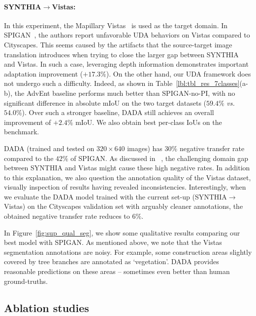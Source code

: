 \documentclass[10pt,twocolumn,letterpaper]{article}
\begin{document}
\paragraph{SYNTHIA$\rightarrow$Vistas:} In this experiment, the Mapillary Vistas~\cite{MVD2017} is used as the target domain. 
In SPIGAN~\cite{lee2018spigan}, the authors report unfavorable UDA behaviors on Vistas compared to Cityscapes. 
This seems caused by the artifacts that the source-target image translation introduces when trying to close the larger gap between SYNTHIA and Vistas.
In such a case, leveraging depth information demonstrates important adaptation improvement ($+17.3\%$).
On the other hand, our UDA framework does not undergo such a difficulty.
Indeed, as shown in Table~\ref{lbl:tbl_res_7classes}(a-b), the AdvEnt baseline performs much better than SPIGAN-no-PI, with no significant difference in absolute mIoU on the two target datasets ($59.4\%$ \textit{vs.} $54.0\%$).
Over such a stronger baseline, DADA still achieves an overall improvement of $+2.4\%$ mIoU.
We also obtain best per-class IoUs on the benchmark.

DADA (trained and tested on $320\times640$ images) has $30\%$ negative transfer rate compared to the $42\%$ of SPIGAN. As discussed in ~\cite{lee2018spigan}, the challenging domain gap between SYNTHIA and Vistas might cause  these high negative rates. In addition to this explanation, we also question the annotation quality of the Vistas dataset, visually inspection of results having revealed inconsistencies. 
Interestingly, when we evaluate the DADA model trained with the current set-up (SYNTHIA$\rightarrow$Vistas) on the Cityscapes validation set with arguably cleaner annotations, the obtained negative transfer rate reduces to $6\%$.

In Figure~\ref{fig:sup_qual_seg}, we show some qualitative results comparing our best model with SPIGAN.
As mentioned above, we note that the Vistas segmentation annotations are noisy.
For example, some construction areas slightly covered by tree branches are annotated as `vegetation'.
DADA provides reasonable predictions on these areas -- sometimes even better than human ground-truths.

\subsection{Ablation studies} \label{sec:exp_abl}
\end{document}
